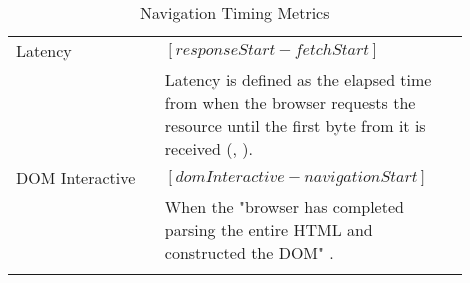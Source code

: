 \begin{center}
\begin{longtable}{ | p{0.3\linewidth} | p{0.6\linewidth} | }
	\hline
	Latency
	& $[responseStart - fetchStart]$ \\ 
	& Latency is defined as the elapsed time from when the browser requests the resource until the first byte from it is received (\cite{2018Akamai}, \cite{2021MDNLatency}). \\

	\hline
	DOM Interactive
	& $[domInteractive - navigationStart]$ \\
	& When the "browser has completed parsing the entire HTML and constructed the DOM" \cite{2018Akamai}. \\

	


	\hline
	\caption{Navigation Timing Metrics} %
	\label{table:navigation_timing_metrics}
	\end{longtable}
\end{center}






